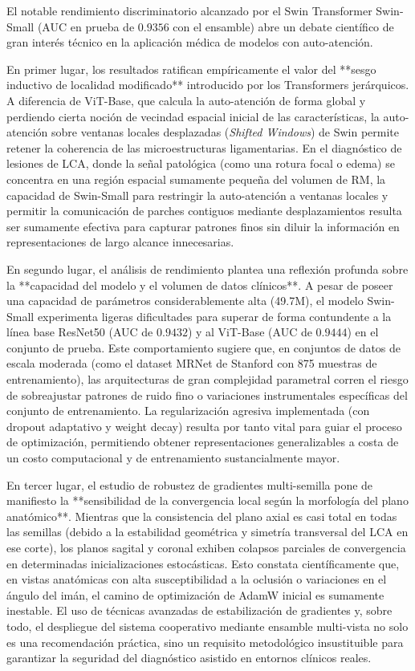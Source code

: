 El notable rendimiento discriminatorio alcanzado por el Swin Transformer Swin-Small (AUC en prueba de $0.9356$ con el ensamble) abre un debate científico de gran interés técnico en la aplicación médica de modelos con auto-atención.

En primer lugar, los resultados ratifican empíricamente el valor del **sesgo inductivo de localidad modificado** introducido por los Transformers jerárquicos. A diferencia de ViT-Base, que calcula la auto-atención de forma global y perdiendo cierta noción de vecindad espacial inicial de las características, la auto-atención sobre ventanas locales desplazadas (\textit{Shifted Windows}) de Swin permite retener la coherencia de las microestructuras ligamentarias. En el diagnóstico de lesiones de LCA, donde la señal patológica (como una rotura focal o edema) se concentra en una región espacial sumamente pequeña del volumen de RM, la capacidad de Swin-Small para restringir la auto-atención a ventanas locales y permitir la comunicación de parches contiguos mediante desplazamientos resulta ser sumamente efectiva para capturar patrones finos sin diluir la información en representaciones de largo alcance innecesarias.

En segundo lugar, el análisis de rendimiento plantea una reflexión profunda sobre la **capacidad del modelo y el volumen de datos clínicos**. A pesar de poseer una capacidad de parámetros considerablemente alta (49.7M), el modelo Swin-Small experimenta ligeras dificultades para superar de forma contundente a la línea base ResNet50 (AUC de $0.9432$) y al ViT-Base (AUC de $0.9444$) en el conjunto de prueba. Este comportamiento sugiere que, en conjuntos de datos de escala moderada (como el dataset MRNet de Stanford con 875 muestras de entrenamiento), las arquitecturas de gran complejidad parametral corren el riesgo de sobreajustar patrones de ruido fino o variaciones instrumentales específicas del conjunto de entrenamiento. La regularización agresiva implementada (con dropout adaptativo y weight decay) resulta por tanto vital para guiar el proceso de optimización, permitiendo obtener representaciones generalizables a costa de un costo computacional y de entrenamiento sustancialmente mayor.

En tercer lugar, el estudio de robustez de gradientes multi-semilla pone de manifiesto la **sensibilidad de la convergencia local según la morfología del plano anatómico**. Mientras que la consistencia del plano axial es casi total en todas las semillas (debido a la estabilidad geométrica y simetría transversal del LCA en ese corte), los planos sagital y coronal exhiben colapsos parciales de convergencia en determinadas inicializaciones estocásticas. Esto constata científicamente que, en vistas anatómicas con alta susceptibilidad a la oclusión o variaciones en el ángulo del imán, el camino de optimización de AdamW inicial es sumamente inestable. El uso de técnicas avanzadas de estabilización de gradientes y, sobre todo, el despliegue del sistema cooperativo mediante ensamble multi-vista no solo es una recomendación práctica, sino un requisito metodológico insustituible para garantizar la seguridad del diagnóstico asistido en entornos clínicos reales.

